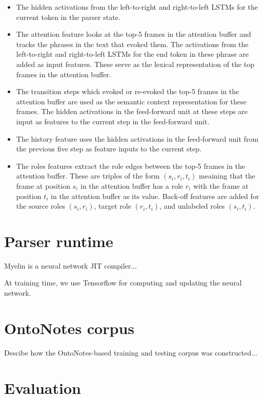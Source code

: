\documentclass[11pt,a4paper]{article}
\begin{document}
\begin{itemize}
  \item The hidden activations from the left-to-right and right-to-left LSTMs
  for the current token in the parser state.
  \item The attention feature looks at the top-5 frames in the attention buffer
  and tracks the phrases in the text that evoked them. The activations from the
  left-to-right and right-to-left LSTMs for the end token in these phrase are
  added as input features. These serve as the lexical representation of the top
  frames in the attention buffer.
  \item The transition steps which evoked or re-evoked the top-5 frames in the
  attention buffer are used as the semantic context representation for these
  frames. The hidden activations in the feed-forward unit at these steps are
  input as features to the current step in the feed-forward unit.
  \item The history feature uses the hidden activations in the feed-forward
  unit from the previous five step as feature inputs to the current step.
  \item The roles features extract the role edges between the top-5 frames in
  the attention buffer. These are triples of the form $(s_i, r_i, t_i)$ meaining
  that the frame at position $s_i$ in the attention buffer has a role $r_i$ with
  the frame at position $t_i$ in the attention buffer as its value. Back-off
  features are added for the source roles $(s_i,r_i)$, target role $(r_i, t_i)$,
  and unlabeled roles $(s_i,t_i)$.
\end{itemize}

\section{Parser runtime}

Myelin is a neural network JIT compiler...

At training time, we use Tensorflow for computing and updating the neural
network.

\section{OntoNotes corpus}

Descibe how the OntoNotes-based training and testing corpus was constructed...

\section{Evaluation}
\end{document}

